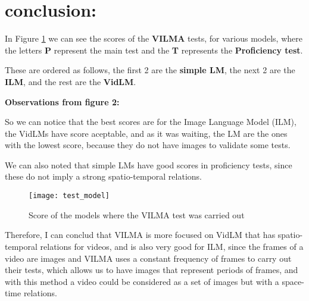 \section{conclusion:}

In Figure \ref{fig:test_model} we can see the scores of the \textbf{VILMA} tests, for various models, where the letters \textbf{P} represent the main test and the \textbf{T} represents the \textbf{Proficiency test}.

These are ordered as follows, the first 2 are the \textbf{simple LM}, the next 2 are the \textbf{ILM}, and the rest are the \textbf{VidLM}.

\textbf{Observations from figure 2:}

So we can notice that the best scores are for the Image Language Model (ILM), the VidLMs have score aceptable, and as it was waiting, the LM are the ones with the lowest score, because they do not have images to validate some tests.

We can also noted that simple LMs have good scores in proficiency tests, since these do not imply a strong spatio-temporal relations.
\begin{figure}[h]
    \centering
    \texttt{[image: test\_model]}
    \caption{Score of the models where the VILMA test was carried out}
    \label{fig:test_model}
\end{figure}

Therefore, I can conclud that VILMA is more focused on VidLM that has spatio-temporal relations for videos, and is also very good for ILM, since the frames of a video are images and VILMA uses a constant frequency of frames to carry out their tests, which allows us to have images that represent periods of frames, and with this method a video could be considered as a set of images but with a space-time relations.
